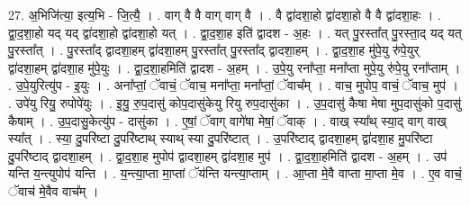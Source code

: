 \documentclass[17pt]{extarticle}
\begin{document}
27. अ॒भिजि॑त्या॒ इत्य॒भि - जि॒त्यै॒ । . वाग् वै वै वाग् वाग् वै । . वै द्वा॑दशा॒हो द्वा॑दशा॒हो वै वै द्वा॑दशा॒हः । . द्वा॒द॒शा॒हो यद् यद् द्वा॑दशा॒हो द्वा॑दशा॒हो यत् । . द्वा॒द॒शा॒ह इति॑ द्वादश - अ॒हः । . यत् पु॒रस्ता᳚त् पु॒रस्ता॒द् यद् यत् पु॒रस्ता᳚त् । . पु॒रस्ता᳚द् द्वादशा॒हम् द्वा॑दशा॒हम् पु॒रस्ता᳚त् पु॒रस्ता᳚द् द्वादशा॒हम् । . द्वा॒द॒शा॒ह मु॑पे॒यु रु॑पे॒युर् द्वा॑दशा॒हम् द्वा॑दशा॒ह मु॑पे॒युः । . द्वा॒द॒शा॒हमिति॑ द्वादश - अ॒हम् । . उ॒पे॒यु रना᳚प्ता॒ मना᳚प्ता मुपे॒यु रु॑पे॒यु रना᳚प्ताम् । . उ॒पे॒युरित्यु॑प - इ॒युः । . अना᳚प्तां॒ ॅवाचं॒ ॅवाच॒ मना᳚प्ता॒ मना᳚प्तां॒ ॅवाच᳚म् । . वाच॒ मुपोप॒ वाचं॒ ॅवाच॒ मुप॑ । . उपे॑यु रियु॒ रुपोपे॑युः । . इ॒यु॒ रु॒प॒दासु॑ कोप॒दासु॑केयु रियु रुप॒दासु॑का । . उ॒प॒दासु॑ कैषा मेषा मुप॒दासु॑को प॒दासु॑ कैषाम् । . उ॒प॒दासु॒केत्यु॑प - दासु॑का । . ए॒षां॒ ॅवाग् वागे॑षा मेषां॒ ॅवाक् । . वाख् स्या᳚थ् स्या॒द् वाग् वाख् स्या᳚त् । . स्या॒ दु॒परि॑ष्टा दु॒परि॑ष्टाथ् स्याथ् स्या दु॒परि॑ष्टात् । . उ॒परि॑ष्टाद् द्वादशा॒हम् द्वा॑दशा॒ह मु॒परि॑ष्टा दु॒परि॑ष्टाद् द्वादशा॒हम् । . द्वा॒द॒शा॒ह मुपोप॑ द्वादशा॒हम् द्वा॑दशा॒ह मुप॑ । . द्वा॒द॒शा॒हमिति॑ द्वादश - अ॒हम् । . उप॑ यन्ति य॒न्त्युपोप॑ यन्ति । . य॒न्त्या॒प्ता मा॒प्तां ॅय॑न्ति यन्त्या॒प्ताम् । . आ॒प्ता मे॒वै वाप्ता मा॒प्ता मे॒व । . ए॒व वाचं॒ ॅवाच॑ मे॒वैव वाच᳚म् । \newline
\end{document}

